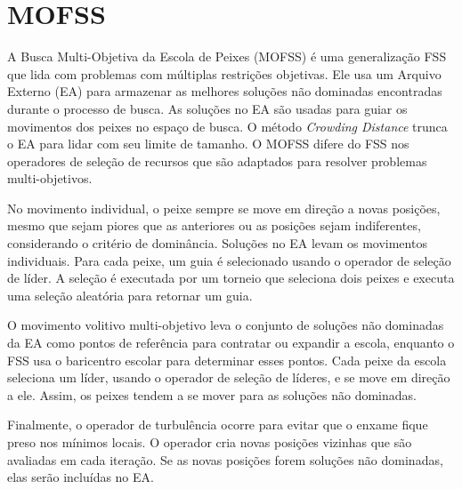 \section{MOFSS}
\label{sec-mofss}

A Busca Multi-Objetiva da Escola de Peixes (MOFSS) é uma generalização FSS que lida com problemas com múltiplas restrições objetivas. Ele usa um Arquivo Externo (EA) para armazenar as melhores soluções não dominadas encontradas durante o processo de busca. As soluções no EA são usadas para guiar os movimentos dos peixes no espaço de busca. O método \textit{Crowding Distance} trunca o EA para lidar com seu limite de tamanho. O MOFSS difere do FSS nos operadores de seleção de recursos que são adaptados para resolver problemas multi-objetivos.

No movimento individual, o peixe sempre se move em direção a novas posições, mesmo que sejam piores que as anteriores ou as posições sejam indiferentes, considerando o critério de dominância. Soluções no EA levam os movimentos individuais. Para cada peixe, um guia é selecionado usando o operador de seleção de líder. A seleção é executada por um torneio que seleciona dois peixes e executa uma seleção aleatória para retornar um guia.

O movimento volitivo multi-objetivo leva o conjunto de soluções não dominadas da EA como pontos de referência para contratar ou expandir a escola, enquanto o FSS usa o baricentro escolar para determinar esses pontos. Cada peixe da escola seleciona um líder, usando o operador de seleção de líderes, e se move em direção a ele. Assim, os peixes tendem a se mover para as soluções não dominadas.

Finalmente, o operador de turbulência ocorre para evitar que o enxame fique preso nos mínimos locais. O operador cria novas posições vizinhas que são avaliadas em cada iteração. Se as novas posições forem soluções não dominadas, elas serão incluídas no EA.

